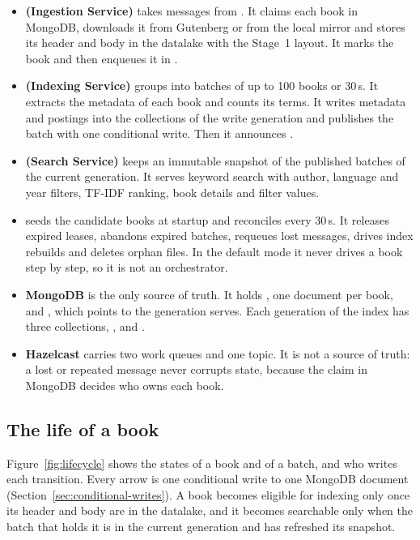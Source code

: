 \begin{itemize}
\item \textbf{ (Ingestion Service)} takes  messages from . It claims
  each book in MongoDB, downloads it from Gutenberg or from the local mirror and stores its header and body in the
  datalake with the Stage~1  layout. It marks the book  and then enqueues it in
  .
\item \textbf{ (Indexing Service)} groups  into batches of up to 100 books or 30\,s.
  It extracts the metadata of each book and counts its terms. It writes metadata and postings into the collections of
  the write generation and publishes the batch with one conditional write. Then it announces .
\item \textbf{ (Search Service)} keeps an immutable snapshot of the published batches of the current
  generation. It serves keyword search with author, language and year filters, TF-IDF ranking, book details and filter
  values.
\item \textbf{} seeds the candidate books at startup and reconciles every 30\,s. It releases expired
  leases, abandons expired batches, requeues lost messages, drives index rebuilds and deletes orphan  files.
  In the default mode it never drives a book step by step, so it is not an orchestrator.
\item \textbf{MongoDB} is the only source of truth. It holds , one document per book, and
  , which points to the generation  serves. Each generation of the index has three
  collections, ,  and .
\item \textbf{Hazelcast} carries two work queues and one topic. It is not a source of truth: a lost or repeated message
  never corrupts state, because the claim in MongoDB decides who owns each book.
\end{itemize}

\subsection{The life of a book}

Figure~\ref{fig:lifecycle} shows the states of a book and of a batch, and who writes each transition. Every arrow is
one conditional write to one MongoDB document (Section~\ref{sec:conditional-writes}). A book becomes eligible for
indexing only once its header and body are in the datalake, and it becomes searchable only when the batch that holds
it is  in the current generation and  has refreshed its snapshot.

